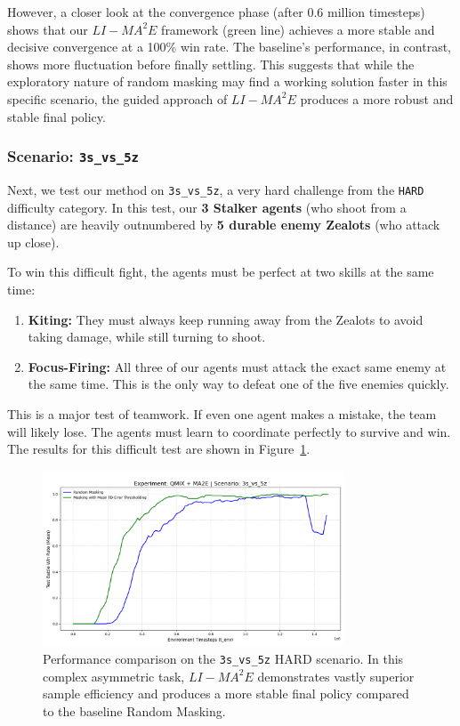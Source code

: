 However, a closer look at the convergence phase (after 0.6 million timesteps) shows that our $LI-{MA}^2E$ framework (green line) achieves a more stable and decisive convergence at a 100\% win rate. The baseline's performance, in contrast, shows more fluctuation before finally settling. This suggests that while the exploratory nature of random masking may find a working solution faster in this specific scenario, the guided approach of $LI-{MA}^2E$ produces a more robust and stable final policy.


\subsubsection{Scenario: \texttt{3s\_vs\_5z}}

Next, we test our method on \texttt{3s\_vs\_5z}, a very hard challenge from the \texttt{HARD} difficulty category. In this test, our \textbf{3 Stalker agents} (who shoot from a distance) are heavily outnumbered by \textbf{5 durable enemy Zealots} (who attack up close).

To win this difficult fight, the agents must be perfect at two skills at the same time:
\begin{enumerate}
    \item \textbf{Kiting:} They must always keep running away from the Zealots to avoid taking damage, while still turning to shoot.
    \item \textbf{Focus-Firing:} All three of our agents must attack the exact same enemy at the same time. This is the only way to defeat one of the five enemies quickly.
\end{enumerate}
This is a major test of teamwork. If even one agent makes a mistake, the team will likely lose. The agents must learn to coordinate perfectly to survive and win. The results for this difficult test are shown in Figure~\ref{fig:3s_vs_5z}.

\begin{figure}[h]
    \centering
    \includegraphics[width=0.8\textwidth]{images_pfe/results_li-ma2e/test_battle_won_mean_3s_vs_5z_Mean_TD-Error_Thresholding _smoothed.png}
    \caption{Performance comparison on the \texttt{3s\_vs\_5z} HARD scenario. In this complex asymmetric task, $LI-{MA}^2E$ demonstrates vastly superior sample efficiency and produces a more stable final policy compared to the baseline Random Masking.}
    \label{fig:3s_vs_5z}
\end{figure}

